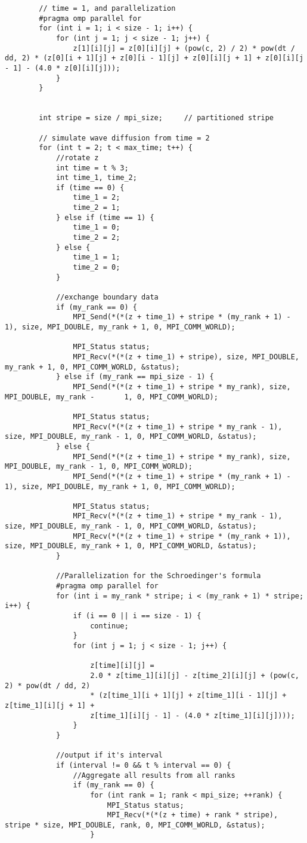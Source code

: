 \documentclass[11pt, letterpaper]{article}
\begin{document}
\begin{lstlisting}
		// time = 1, and parallelization
		#pragma omp parallel for
		for (int i = 1; i < size - 1; i++) {
			for (int j = 1; j < size - 1; j++) {
				z[1][i][j] = z[0][i][j] + (pow(c, 2) / 2) * pow(dt / dd, 2) * (z[0][i + 1][j] + z[0][i - 1][j] + z[0][i][j + 1] + z[0][i][j - 1] - (4.0 * z[0][i][j]));
			}
		}
		
		
		int stripe = size / mpi_size;     // partitioned stripe
		
		// simulate wave diffusion from time = 2
		for (int t = 2; t < max_time; t++) {
			//rotate z
			int time = t % 3;
			int time_1, time_2;
			if (time == 0) {
				time_1 = 2;
				time_2 = 1;
			} else if (time == 1) {
				time_1 = 0;
				time_2 = 2;
			} else {
				time_1 = 1;
				time_2 = 0;
			}
		
			//exchange boundary data
			if (my_rank == 0) {
				MPI_Send(*(*(z + time_1) + stripe * (my_rank + 1) - 1), size, MPI_DOUBLE, my_rank + 1, 0, MPI_COMM_WORLD);
				
				MPI_Status status;
				MPI_Recv(*(*(z + time_1) + stripe), size, MPI_DOUBLE, my_rank + 1, 0, MPI_COMM_WORLD, &status);
			} else if (my_rank == mpi_size - 1) {
				MPI_Send(*(*(z + time_1) + stripe * my_rank), size, MPI_DOUBLE, my_rank -		1, 0, MPI_COMM_WORLD);
				
				MPI_Status status;
				MPI_Recv(*(*(z + time_1) + stripe * my_rank - 1), size, MPI_DOUBLE, my_rank - 1, 0, MPI_COMM_WORLD, &status);
			} else {
				MPI_Send(*(*(z + time_1) + stripe * my_rank), size, MPI_DOUBLE, my_rank - 1, 0,	MPI_COMM_WORLD);
				MPI_Send(*(*(z + time_1) + stripe * (my_rank + 1) - 1), size, MPI_DOUBLE, my_rank + 1, 0, MPI_COMM_WORLD);
				
				MPI_Status status;
				MPI_Recv(*(*(z + time_1) + stripe * my_rank - 1), size, MPI_DOUBLE, my_rank - 1, 0, MPI_COMM_WORLD, &status);
				MPI_Recv(*(*(z + time_1) + stripe * (my_rank + 1)), size, MPI_DOUBLE, my_rank + 1, 0, MPI_COMM_WORLD, &status);
			}
			
			//Parallelization for the Schroedinger's formula
			#pragma omp parallel for
			for (int i = my_rank * stripe; i < (my_rank + 1) * stripe; i++) {
				if (i == 0 || i == size - 1) {
					continue;
				}
				for (int j = 1; j < size - 1; j++) {
				
					z[time][i][j] =
					2.0 * z[time_1][i][j] - z[time_2][i][j] + (pow(c, 2) * pow(dt / dd, 2)
					* (z[time_1][i + 1][j] + z[time_1][i - 1][j] + z[time_1][i][j + 1] +
					z[time_1][i][j - 1] - (4.0 * z[time_1][i][j])));
				}
			}
				
			//output if it's interval
			if (interval != 0 && t % interval == 0) {
				//Aggregate all results from all ranks
				if (my_rank == 0) {
					for (int rank = 1; rank < mpi_size; ++rank) {
						MPI_Status status;
						MPI_Recv(*(*(z + time) + rank * stripe), stripe * size, MPI_DOUBLE, rank, 0, MPI_COMM_WORLD, &status);
					}
				

\end{lstlisting}
\end{document}
